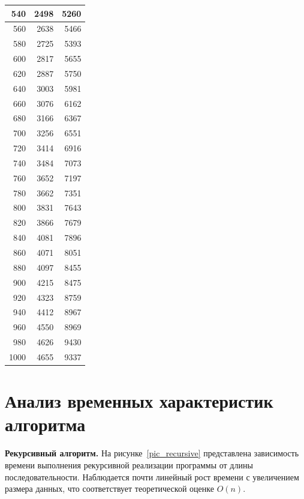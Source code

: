 \begin{table}[H]
\begin{center}
{\begin{tabular}{|r|r|r|}
				540 & 2498 & 5260 \\ \hline
				560 & 2638 & 5466 \\ \hline
				580 & 2725 & 5393 \\ \hline
				600 & 2817 & 5655 \\ \hline
				620 & 2887 & 5750 \\ \hline
				640 & 3003 & 5981 \\ \hline
				660 & 3076 & 6162 \\ \hline
				680 & 3166 & 6367 \\ \hline
				700 & 3256 & 6551 \\ \hline
				720 & 3414 & 6916 \\ \hline
				740 & 3484 & 7073 \\ \hline
				760 & 3652 & 7197 \\ \hline
				780 & 3662 & 7351 \\ \hline
				800 & 3831 & 7643 \\ \hline
				820 & 3866 & 7679 \\ \hline
				840 & 4081 & 7896 \\ \hline
				860 & 4071 & 8051 \\ \hline
				880 & 4097 & 8455 \\ \hline
				900 & 4215 & 8475 \\ \hline
				920 & 4323 & 8759 \\ \hline
				940 & 4412 & 8967 \\ \hline
				960 & 4550 & 8969 \\ \hline
				980 & 4626 & 9430 \\ \hline
				1000 & 4655 & 9337 \\ \hline
		\end{tabular}}
	\end{center}
\end{table}

\section{Анализ временных характеристик алгоритма}

\textbf{Рекурсивный алгоритм.}  
На рисунке~\ref{pic_recursive} представлена зависимость времени выполнения рекурсивной реализации программы от длины последовательности.  
Наблюдается почти линейный рост времени с увеличением размера данных, что соответствует теоретической оценке $O(n)$.

